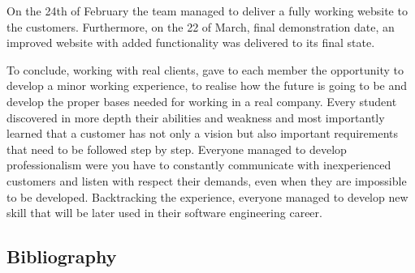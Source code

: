 \documentclass{l3proj}
\begin{document}
On the 24th of February the team managed to deliver a fully working website to the customers. Furthermore, on the 22 of March, final demonstration date, an improved website with added functionality was delivered to its final state.

To conclude, working with real clients, gave to each member the opportunity to develop a minor working experience, to realise how the future is going to be and develop the proper bases needed for working in a real company. Every student discovered in more depth their abilities and weakness and most importantly learned that a customer has not only a vision but also important requirements that need to be followed step by step. Everyone managed to develop professionalism were you have to constantly communicate with inexperienced customers and listen with respect their demands, even when they are impossible to be developed. Backtracking the experience, everyone managed to develop new skill that will be later used in their software engineering career.



\pagebreak

{}





\iffalse


\subsection{Bibliography}
\label{Bibliography}
\end{document}
